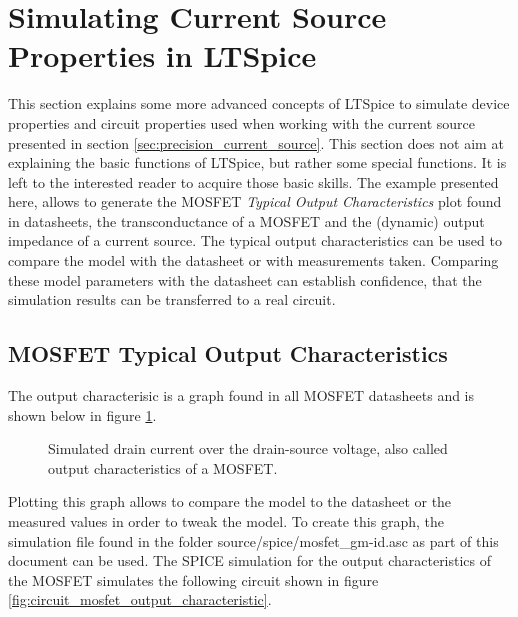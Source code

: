 \documentclass[12pt]{book}
\providecommand{\external}[1]{\textsf{#1}}
\begin{document}
\section{Simulating Current Source Properties in LTSpice}
\label{sec:ltspice_current_source}
This section explains some more advanced concepts of LTSpice \cite{ltspice} to simulate device properties and circuit properties used when working with the current source presented in section \ref{sec:precision_current_source}. This section does not aim at explaining the basic functions of LTSpice, but rather some special functions. It is left to the interested reader to acquire those basic skills. The example presented here, allows to generate the MOSFET \textit{Typical Output Characteristics} plot found in datasheets, the transconductance of a MOSFET and the (dynamic) output impedance of a current source. The typical output characteristics can be used to compare the model with the datasheet or with measurements taken. Comparing these model parameters with the datasheet can establish confidence, that the simulation results can be transferred to a real circuit.

\subsection{MOSFET Typical Output Characteristics}
The output characterisic is a graph found in all MOSFET datasheets and is shown below in figure \ref{fig:ltspice_mosfet_drain_current_example}.

\begin{figure}[hb]
    \centering
    
    \caption{Simulated drain current over the drain-source voltage, also called output characteristics of a MOSFET.}
    \label{fig:ltspice_mosfet_drain_current_example}
\end{figure}

Plotting this graph allows to compare the model to the datasheet or the measured values in order to tweak the model. To create this graph, the simulation file found in the folder \external{source/spice/mosfet\_gm-id.asc} as part of this document can be used. The SPICE simulation for the output characteristics of the MOSFET simulates the following circuit shown in figure \ref{fig:circuit_mosfet_output_characteristic}.
\end{document}
